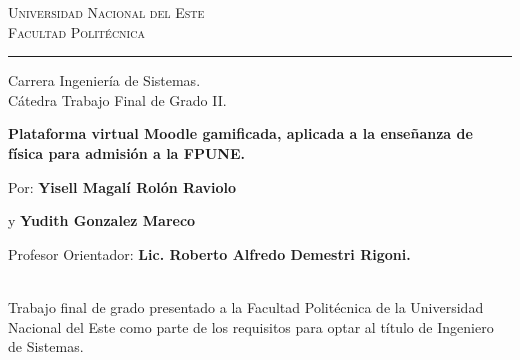 \vspace*{-3cm}

\thispagestyle{empty}

{\bf
\begin{center}
\large
\vspace*{-1 cm}\Large \textsc{Universidad Nacional del Este} \\
\Large \textsc{Facultad Politécnica} \\
\vspace*{0.5 cm}\hrule
\vspace*{0.5 cm}\Large Carrera Ingeniería de Sistemas.\\
\vspace*{0 cm}\Large Cátedra Trabajo Final de Grado II.\\
\end{center}
}

\vspace{3.5 cm}
{
\noindent
\begin{center}
\huge \bf Plataforma virtual Moodle gamificada, aplicada a la enseñanza de física para admisión a la FPUNE.
\end{center}
}


\vspace{0.5 cm}
{ 

Por: \textbf{\Large Yisell Magalí Rolón Raviolo}

\hspace{1 cm} y \textbf{\Large Yudith Gonzalez Mareco}

\vspace*{.5 cm}
Profesor Orientador: \textbf{\large Lic. Roberto Alfredo Demestri Rigoni.}
}%
\vspace*{0.5 cm}\\
Trabajo final de grado presentado a la Facultad Politécnica de la Universidad Nacional del Este como parte de los requisitos para optar al título de Ingeniero de Sistemas.


\vspace{4.0cm}



